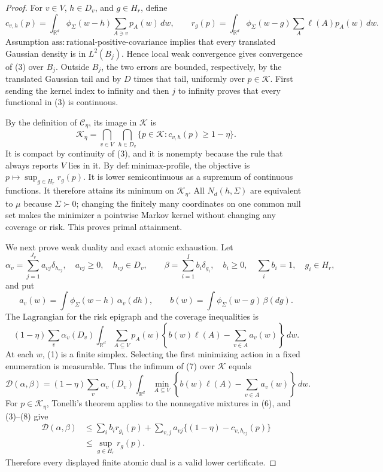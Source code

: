 \documentclass{article}
\begin{document}
\begin{proof}
For \(v\in V\), \(h\in D_v\), and \(g\in H_r\), define
\[
 c_{v,h}(p)=
 \int_{\mathbb R^d}\phi_\Sigma(w-h)
       \sum_{A\ni v}p_A(w)\,dw,
 \qquad
 r_g(p)=
 \int_{\mathbb R^d}\phi_\Sigma(w-g)
       \sum_A\ell(A)p_A(w)\,dw.
\tag{3}
\]
Assumption \(\mathrm{ass:rational\mbox{-}positive\mbox{-}covariance}\)
implies that every translated Gaussian density is in \(L^2(B_j)\).  Hence
local weak convergence gives convergence of (3) over \(B_j\).  Outside
\(B_j\), the two errors are bounded, respectively, by the translated
Gaussian tail and by \(D\) times that tail, uniformly over \(p\in\mathscr K\).
First sending the kernel index to infinity and then \(j\) to infinity proves
that every functional in (3) is continuous.

By the definition of \(\mathcal C_\eta\), its image in \(\mathscr K\) is
\[
 \mathscr K_\eta=
 \bigcap_{v\in V}\ \bigcap_{h\in D_v}
 \{p\in\mathscr K:c_{v,h}(p)\geq1-\eta\}.
\tag{4}
\]
It is compact by continuity of (3), and it is nonempty because the rule that
always reports \(V\) lies in it.  By
\(\mathrm{def:minimax\mbox{-}profile}\), the objective is
\(p\mapsto\sup_{g\in H_r}r_g(p)\).  It is lower semicontinuous as a
supremum of continuous functions.  It therefore attains its minimum on
\(\mathscr K_\eta\).  All \(N_d(h,\Sigma)\) are equivalent to \(\mu\) because
\(\Sigma\succ0\); changing the finitely many coordinates on one common null
set makes the minimizer a pointwise Markov kernel without changing any
coverage or risk.  This proves primal attainment.

We next prove weak duality and exact atomic exhaustion.  Let
\[
 \alpha_v=\sum_{j=1}^{J_v}a_{vj}\delta_{h_{vj}},
 \quad a_{vj}\geq0,\quad h_{vj}\in D_v,
 \qquad
 \beta=\sum_{i=1}^{I}b_i\delta_{g_i},
 \quad b_i\geq0,\quad\sum_i b_i=1,\quad g_i\in H_r,
\tag{5}
\]
and put
\[
 a_v(w)=\int\phi_\Sigma(w-h)\,\alpha_v(dh),
 \qquad
 b(w)=\int\phi_\Sigma(w-g)\,\beta(dg).
\tag{6}
\]
The Lagrangian for the risk epigraph and the coverage inequalities is
\[
 (1-\eta)\sum_v\alpha_v(D_v)
 \int_{\mathbb R^d}\sum_{A\subseteq V}p_A(w)
 \left\{b(w)\ell(A)-\sum_{v\in A}a_v(w)\right\}\,dw .
\tag{7}
\]
At each \(w\), (1) is a finite simplex.  Selecting the first minimizing
action in a fixed enumeration is measurable.  Thus the infimum of (7) over
\(\mathscr K\) equals
\[
 \mathcal D(\alpha,\beta)=
 (1-\eta)\sum_v\alpha_v(D_v)
 \int_{\mathbb R^d}\min_{A\subseteq V}
 \left\{b(w)\ell(A)-\sum_{v\in A}a_v(w)\right\}\,dw .
\tag{8}
\]
For \(p\in\mathscr K_\eta\), Tonelli's theorem applies to the nonnegative
mixtures in (6), and (3)--(8) give
\[
 \begin{aligned}
 \mathcal D(\alpha,\beta)
 &\leq
 \sum_i b_i r_{g_i}(p)
 +\sum_{v,j}a_{vj}\{(1-\eta)-c_{v,h_{vj}}(p)\}\\
 &\leq \sup_{g\in H_r}r_g(p).
 \end{aligned}
\tag{9}
\]
Therefore every displayed finite atomic dual is a valid lower certificate.


\end{proof}
\end{document}
